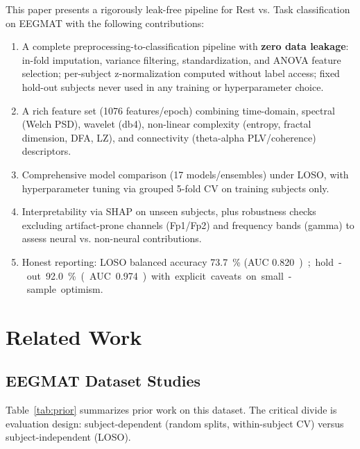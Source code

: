 \documentclass[conference]{IEEEtran}
\begin{document}
This paper presents a rigorously leak-free pipeline for Rest vs. Task classification on EEGMAT with the following contributions:
\begin{enumerate}
    \item A complete preprocessing-to-classification pipeline with \textbf{zero data leakage}: in-fold imputation, variance filtering, standardization, and ANOVA feature selection; per-subject z-normalization computed without label access; fixed hold-out subjects never used in any training or hyperparameter choice.
    \item A rich feature set (\num{1076} features/epoch) combining time-domain, spectral (Welch PSD), wavelet (db4), non-linear complexity (entropy, fractal dimension, DFA, LZ), and connectivity (theta-alpha PLV/coherence) descriptors.
    \item Comprehensive model comparison (\num{17} models/ensembles) under LOSO, with hyperparameter tuning via grouped 5-fold CV on training subjects only.
    \item Interpretability via SHAP on unseen subjects, plus robustness checks excluding artifact-prone channels (Fp1/Fp2) and frequency bands (gamma) to assess neural vs. non-neural contributions.
    \item Honest reporting: LOSO balanced accuracy \SI{73.7}{\%} (AUC \SI{0.820}); hold-out \SI{92.0}{\%} (AUC \SI{0.974}) with explicit caveats on small-sample optimism.
\end{enumerate}

\section{Related Work}

\subsection{EEGMAT Dataset Studies}
Table~\ref{tab:prior} summarizes prior work on this dataset. The critical divide is evaluation design: subject-dependent (random splits, within-subject CV) versus subject-independent (LOSO).
\end{document}
